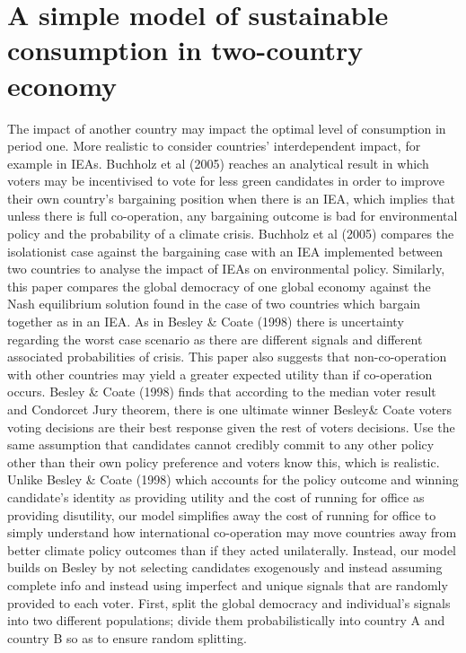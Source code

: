 \documentclass[11pt,preprint, authoryear]{elsarticle}
\numberwithin{equation}{section}
\numberwithin{figure}{section}
\numberwithin{table}{section}
\begin{document}
\hypertarget{a-simple-model-of-sustainable-consumption-in-two-country-economy}{%
\section{A simple model of sustainable consumption in two-country
economy}\label{a-simple-model-of-sustainable-consumption-in-two-country-economy}}

The impact of another country may impact the optimal level of
consumption in period one. More realistic to consider countries'
interdependent impact, for example in IEAs. Buchholz et al (2005)
reaches an analytical result in which voters may be incentivised to vote
for less green candidates in order to improve their own country's
bargaining position when there is an IEA, which implies that unless
there is full co-operation, any bargaining outcome is bad for
environmental policy and the probability of a climate crisis. Buchholz
et al (2005) compares the isolationist case against the bargaining case
with an IEA implemented between two countries to analyse the impact of
IEAs on environmental policy. Similarly, this paper compares the global
democracy of one global economy against the Nash equilibrium solution
found in the case of two countries which bargain together as in an IEA.
As in Besley \& Coate (1998) there is uncertainty regarding the worst
case scenario as there are different signals and different associated
probabilities of crisis. This paper also suggests that non-co-operation
with other countries may yield a greater expected utility than if
co-operation occurs. Besley \& Coate (1998) finds that according to the
median voter result and Condorcet Jury theorem, there is one ultimate
winner Besley\& Coate voters voting decisions are their best response
given the rest of voters decisions. Use the same assumption that
candidates cannot credibly commit to any other policy other than their
own policy preference and voters know this, which is realistic. Unlike
Besley \& Coate (1998) which accounts for the policy outcome and winning
candidate's identity as providing utility and the cost of running for
office as providing disutility, our model simplifies away the cost of
running for office to simply understand how international co-operation
may move countries away from better climate policy outcomes than if they
acted unilaterally. Instead, our model builds on Besley by not selecting
candidates exogenously and instead assuming complete info and instead
using imperfect and unique signals that are randomly provided to each
voter. First, split the global democracy and individual's signals into
two different populations; divide them probabilistically into country A
and country B so as to ensure random splitting.
\end{document}
